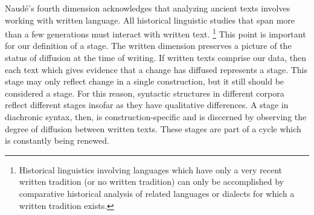 ﻿\documentclass[output=paper]{langsci/langscibook}
\begin{document}
Naudé's fourth dimension acknowledges that analyzing ancient texts involves
working with written language. All historical linguistic studies that span
more than a few generations must interact with written text.%
%
\footnote{Historical linguistics involving languages which have only a very
recent written tradition (or no written tradition) can only be accomplished
by comparative historical analysis of related languages or dialects for
which a written tradition exists.} 
%
This point is
important for our definition of a stage. The written dimension preserves a
picture of the status of diffusion at the time of writing. If written texts
comprise our data, then each text which gives evidence that a change has
diffused represents a stage. This stage may only reflect change in a single
construction, but it still should be considered a stage. For this reason,
syntactic structures in different corpora reflect different stages insofar
as they have qualitative differences. A stage in diachronic syntax, then,
is construction-specific and is discerned by observing the degree of
diffusion between written texts. These stages are part of a cycle which is
constantly being renewed. 
\end{document}
